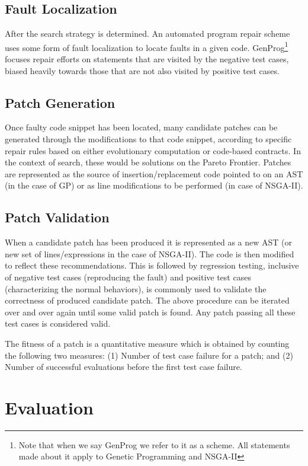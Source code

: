 \documentclass{sig-alternate}
\theoremstyle{break}
\begin{document}
\subsection{Fault Localization}
After the search strategy is determined. An automated program repair scheme uses some form of fault localization to locate faults in a given code. GenProg\footnote{Note that when we say GenProg we refer to it as a scheme. All statements made about it apply to Genetic Programming and NSGA-II} focuses repair efforts on statements that are visited by the negative test cases, biased heavily towards those that are not also visited by positive test cases.
 
\subsection{Patch Generation}
Once faulty code snippet has been located, many candidate patches can be generated through the modifications to that code snippet, according to specific repair rules based on either evolutionary computation or code-based contracts. In the context of search, these would be solutions on the Pareto Frontier. Patches are represented as the source of insertion/replacement code pointed to on an AST (in the case of GP) or as line modifications to be performed (in case of NSGA-II). 

\subsection{Patch Validation}
When a candidate patch has been produced it is represented as a new AST (or new set of lines/expressions in the case of NSGA-II). The code is then modified to reflect these recommendations. This is followed by regression testing, inclusive of negative test cases (reproducing the fault) and positive test cases (characterizing the normal behaviors), is commonly used to validate the correctness of produced candidate patch. The above procedure can be iterated over and over again until some valid patch is found. Any patch passing all these test cases is considered valid. 

The fitness of a patch is a quantitative measure which is obtained by counting the following two measures: (1) Number of test case failure for a patch; and (2) Number of successful evaluations before the first test case failure. 

%

\section{Evaluation}
\label{eval}
\end{document}
